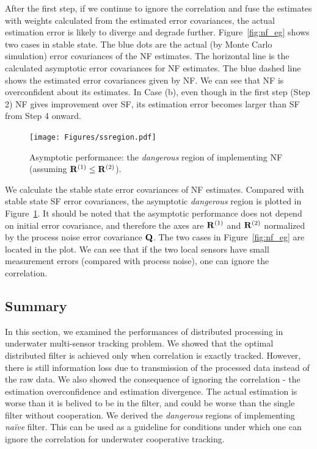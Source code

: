 After the first step, if we continue to ignore the correlation and fuse the estimates with weights calculated from the estimated error covariances, the actual estimation error is likely to diverge and degrade further. Figure~\ref{fig:nf_eg} shows two cases in stable state. The blue dots are the actual (by Monte Carlo simulation) error covariances of the NF estimates. The horizontal line is the calculated asymptotic error covariances for NF estimates. The blue dashed line shows the estimated error covariances given by NF. We can see that NF is overconfident about its estimates. In Case (b), even though in the first step (Step 2) NF gives improvement over SF, its estimation error becomes larger than SF from Step 4 onward.

\begin{figure}[htbp]
\centering
\texttt{[image: Figures/ssregion.pdf]}
\caption{Asymptotic performance: the \textit{dangerous} region of implementing NF (assuming ${\bf R}^{(1)}\leq{\bf R}^{(2)}$).}
\label{fig:ssregion}
\end{figure}

We calculate the stable state error covariances of NF estimates. Compared with stable state SF error covariances, the asymptotic \textit{dangerous} region is plotted in Figure~\ref{fig:ssregion}. It should be noted that the asymptotic performance does not depend on initial error covariance, and therefore the axes are ${\bf R}^{(1)}$ and ${\bf R}^{(2)}$ normalized by the process noise error covariance ${\bf Q}$. The two cases in Figure~\ref{fig:nf_eg} are located in the plot. We can see that if the two local sensors have small measurement errors (compared with process noise), one can ignore the correlation.

\subsection{Summary}
In this section, we examined the performances of distributed processing in underwater multi-sensor tracking problem. We showed that the optimal distributed filter is achieved only when correlation is exactly tracked. However, there is still information loss due to transmission of the processed data instead of the raw data. We also showed the consequence of ignoring the correlation - the estimation overconfidence and estimation divergence. The actual estimation is worse than it is belived to be in the filter, and could be worse than the single filter without cooperation. We derived the \textit{dangerous} regions of implementing \textit{na\"ive} filter. This can be used as a guideline for conditions under which one can ignore the correlation for underwater cooperative tracking.

